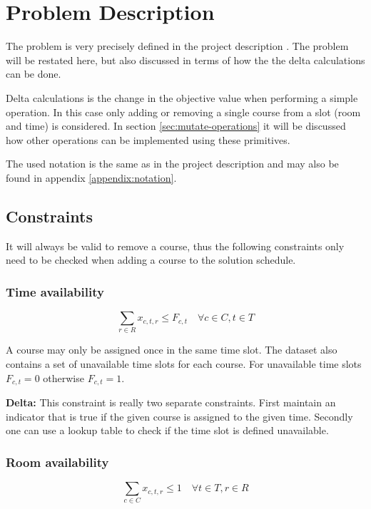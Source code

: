 \section{Problem Description}

The problem is very precisely defined in the project description \cite{assignment}. The problem will be restated here, but also discussed in terms of how the the delta calculations can be done.

Delta calculations is the change in the objective value when performing a simple operation. In this case only adding or removing a single course from a slot (room and time) is considered. In section \ref{sec:mutate-operations} it will be discussed how other operations can be implemented using these primitives.

The used notation is the same as in the project description \cite{assignment} and may also be found in appendix \ref{appendix:notation}.

\subsection{Constraints}
\label{sec:problem-constraints}

It will always be valid to remove a course, thus the following constraints only need to be checked when adding a course to the solution schedule.

\subsubsection{Time availability}
\begin{equation}
    \sum_{r \in R} x_{c, t, r} \le F_{c, t} \quad \forall c \in C, t \in T
\end{equation}

A course may only be assigned once in the same time slot. The dataset also contains a set of unavailable time slots for each course. For unavailable time slots $F_{c, t} = 0$ otherwise $F_{c, t} = 1$.

\textbf{Delta:} This constraint is really two separate constraints. First maintain an indicator that is true if the given course is assigned to the given time. Secondly one can use a lookup table to check if the time slot is defined unavailable.

\subsubsection{Room availability}
\begin{equation}
    \sum_{c \in C} x_{c, t, r} \le 1 \quad \forall t \in T, r \in R
\end{equation}

